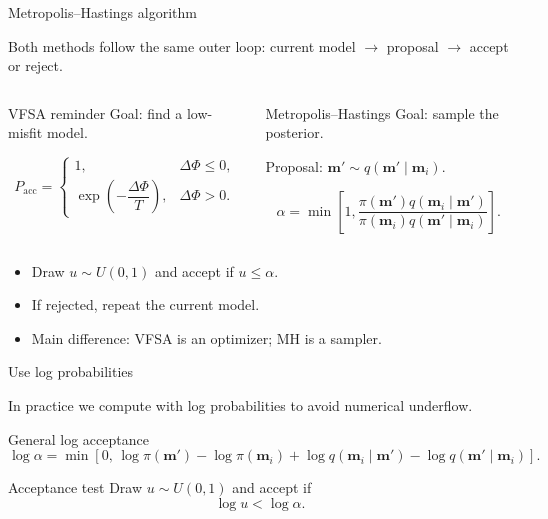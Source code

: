 \documentclass[aspectratio=169]{beamer}
\renewcommand{\vec}[1]{\mathbf{#1}}
\newcommand{\mm}{ {\vec{m}} }
\begin{document}
\begin{frame}{Metropolis--Hastings algorithm}
\footnotesize

Both methods follow the same outer loop: current model $\rightarrow$ proposal $\rightarrow$ accept or reject.

\begin{columns}[T]
\begin{block}{VFSA reminder}
Goal: find a low-misfit model.

\[
P_{\mathrm{acc}} =
\begin{cases}
1, & \Delta\Phi \leq 0,\\
\exp\!\left(-\dfrac{\Delta\Phi}{T}\right), & \Delta\Phi > 0.
\end{cases}
\]
\end{block}

\begin{block}{Metropolis--Hastings}
Goal: sample the posterior.

Proposal: $\mm'\sim q(\mm'\mid\mm_i)$.

\[
\alpha
=
\min\left[
1,
\frac{\pi(\mm')q(\mm_i\mid\mm')}
{\pi(\mm_i)q(\mm'\mid\mm_i)}
\right].
\]
\end{block}
\end{columns}

\begin{itemize}
    \item[--] Draw $u\sim U(0,1)$ and accept if $u\leq\alpha$.
    \item[--] If rejected, repeat the current model.
    \item[--] Main difference: VFSA is an optimizer; MH is a sampler.
\end{itemize}
\end{frame}

\begin{frame}{Use log probabilities}
\small

In practice we compute with log probabilities to avoid numerical underflow.

\begin{block}{General log acceptance}
\[
\log\alpha
=
\min\left[
0,\,
\log\pi(\mm')-\log\pi(\mm_i)
+
\log q(\mm_i\mid\mm')
-
\log q(\mm'\mid\mm_i)
\right].
\]
\end{block}

\begin{alertblock}{Acceptance test}
Draw $u\sim U(0,1)$ and accept if
\[
\log u < \log\alpha.
\]
\end{alertblock}
\end{frame}
\end{document}
